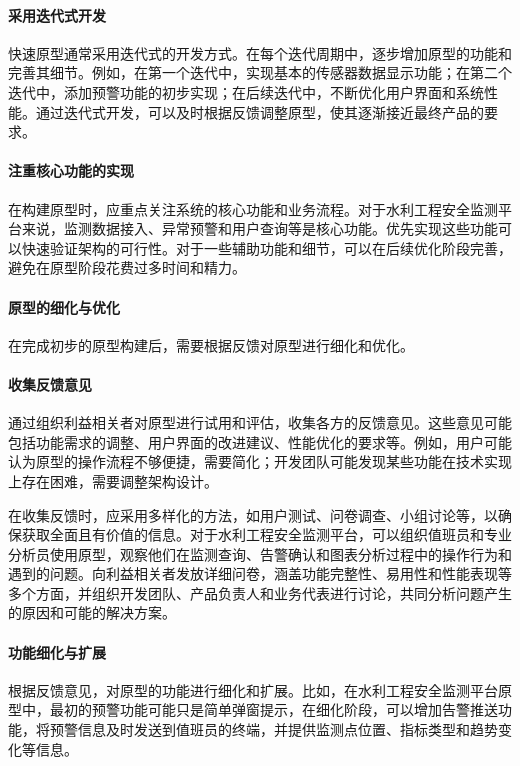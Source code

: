 \paragraph{采用迭代式开发}快速原型通常采用迭代式的开发方式。在每个迭代周期中，逐步增加原型的功能和完善其细节。例如，在第一个迭代中，实现基本的传感器数据显示功能；在第二个迭代中，添加预警功能的初步实现；在后续迭代中，不断优化用户界面和系统性能。通过迭代式开发，可以及时根据反馈调整原型，使其逐渐接近最终产品的要求。

\paragraph{注重核心功能的实现}在构建原型时，应重点关注系统的核心功能和业务流程。对于水利工程安全监测平台来说，监测数据接入、异常预警和用户查询等是核心功能。优先实现这些功能可以快速验证架构的可行性。对于一些辅助功能和细节，可以在后续优化阶段完善，避免在原型阶段花费过多时间和精力。

\paragraph{原型的细化与优化}

在完成初步的原型构建后，需要根据反馈对原型进行细化和优化。

\paragraph{收集反馈意见}通过组织利益相关者对原型进行试用和评估，收集各方的反馈意见。这些意见可能包括功能需求的调整、用户界面的改进建议、性能优化的要求等。例如，用户可能认为原型的操作流程不够便捷，需要简化；开发团队可能发现某些功能在技术实现上存在困难，需要调整架构设计。

在收集反馈时，应采用多样化的方法，如用户测试、问卷调查、小组讨论等，以确保获取全面且有价值的信息。对于水利工程安全监测平台，可以组织值班员和专业分析员使用原型，观察他们在监测查询、告警确认和图表分析过程中的操作行为和遇到的问题。向利益相关者发放详细问卷，涵盖功能完整性、易用性和性能表现等多个方面，并组织开发团队、产品负责人和业务代表进行讨论，共同分析问题产生的原因和可能的解决方案。

\paragraph{功能细化与扩展}根据反馈意见，对原型的功能进行细化和扩展。比如，在水利工程安全监测平台原型中，最初的预警功能可能只是简单弹窗提示，在细化阶段，可以增加告警推送功能，将预警信息及时发送到值班员的终端，并提供监测点位置、指标类型和趋势变化等信息。

